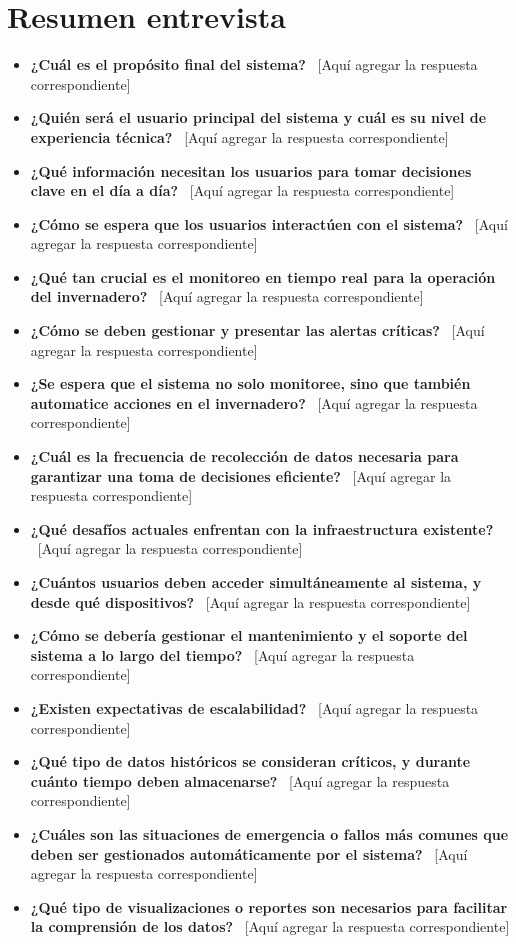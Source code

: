 \documentclass[12pt]{report}
\begin{document}
\chapter{Resumen entrevista}
\begin{itemize} \item \textbf{¿Cuál es el propósito final del sistema?} \ [Aquí agregar la respuesta correspondiente] \item \textbf{¿Quién será el usuario principal del sistema y cuál es su nivel de experiencia técnica?} \ [Aquí agregar la respuesta correspondiente] \item \textbf{¿Qué información necesitan los usuarios para tomar decisiones clave en el día a día?} \ [Aquí agregar la respuesta correspondiente] \item \textbf{¿Cómo se espera que los usuarios interactúen con el sistema?} \ [Aquí agregar la respuesta correspondiente] \item \textbf{¿Qué tan crucial es el monitoreo en tiempo real para la operación del invernadero?} \ [Aquí agregar la respuesta correspondiente] \item \textbf{¿Cómo se deben gestionar y presentar las alertas críticas?} \ [Aquí agregar la respuesta correspondiente] \item \textbf{¿Se espera que el sistema no solo monitoree, sino que también automatice acciones en el invernadero?} \ [Aquí agregar la respuesta correspondiente] \item \textbf{¿Cuál es la frecuencia de recolección de datos necesaria para garantizar una toma de decisiones eficiente?} \ [Aquí agregar la respuesta correspondiente] \item \textbf{¿Qué desafíos actuales enfrentan con la infraestructura existente?} \ [Aquí agregar la respuesta correspondiente] \item \textbf{¿Cuántos usuarios deben acceder simultáneamente al sistema, y desde qué dispositivos?} \ [Aquí agregar la respuesta correspondiente] \item \textbf{¿Cómo se debería gestionar el mantenimiento y el soporte del sistema a lo largo del tiempo?} \ [Aquí agregar la respuesta correspondiente] \item \textbf{¿Existen expectativas de escalabilidad?} \ [Aquí agregar la respuesta correspondiente] \item \textbf{¿Qué tipo de datos históricos se consideran críticos, y durante cuánto tiempo deben almacenarse?} \ [Aquí agregar la respuesta correspondiente] \item \textbf{¿Cuáles son las situaciones de emergencia o fallos más comunes que deben ser gestionados automáticamente por el sistema?} \ [Aquí agregar la respuesta correspondiente] \item \textbf{¿Qué tipo de visualizaciones o reportes son necesarios para facilitar la comprensión de los datos?} \ [Aquí agregar la respuesta correspondiente] \end{itemize}
\end{document}

